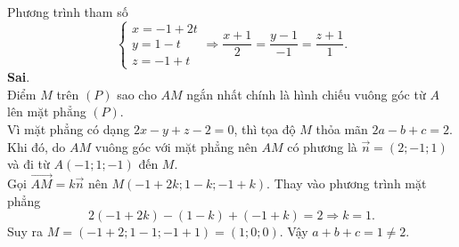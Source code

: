 \begin{ex}
{\begin{itemchoice}
			Phương  trình tham số
			 \[
			\begin{cases}
				x = -1 +  2t\\
				y = 1 -  t\\
				z = -1  + t
			\end{cases}
			\Rightarrow \dfrac{x + 1}{2} = \dfrac{y - 1}{-1} = \dfrac{z  + 1}{1}.
			 \]
			 \itemch \textbf{Sai}.\\
			Điểm $M$ trên $(P)$ sao cho $AM$ ngắn nhất chính  là hình chiếu vuông góc từ $A$ lên mặt phẳng $(P)$.\\
			Vì mặt phẳng  có dạng $2x - y + z - 2 = 0$, thì tọa độ $M$ thỏa mãn $2a - b + c = 2$.\\
			Khi đó, do $AM$ vuông góc với mặt phẳng nên $AM$ có phương là $\overrightarrow{n}  = (2; -1; 1)$ và đi từ $A(-1; 1; -1)$ đến $M$.\\
			Gọi $\overrightarrow{AM}=k\overrightarrow{n} $ nên $M(-1 + 2k; 1 - k; -1 +  k)$. Thay vào phương trình mặt phẳng
			 \[
			2(-1 + 2k) - (1 - k) + (-1 + k)  = 2 \Rightarrow k = 1.
			 \]
			Suy ra $M =  (-1 + 2; 1 - 1; -1 + 1) = (1; 0; 0)$. Vậy $a+b+c=1\neq 2$.
		\end{itemchoice}
	} 
\end{ex}


